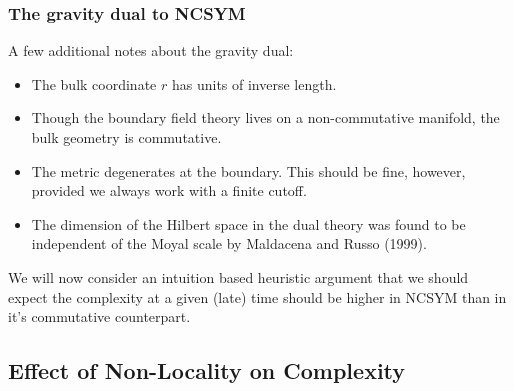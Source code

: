 \documentclass[8pt,aspectratio=169]{beamer}
\begin{document}
\begin{frame}
\frametitle{The gravity dual to NCSYM}

A few additional notes about the gravity dual:

\begin{itemize}

\item The bulk coordinate $r$ has units of inverse length.

\item Though the boundary field theory lives on a non-commutative manifold, the bulk geometry is commutative.

\item The metric degenerates at the boundary. This should be fine, however, provided we always work with a finite cutoff.

\item The dimension of the Hilbert space in the dual theory was found to be independent of the Moyal scale by Maldacena and Russo (1999).

\end{itemize}

We will now consider an intuition based heuristic argument that we should expect the complexity at a given (late) time should be higher in NCSYM than in it's commutative counterpart.

\end{frame}

\subsection{Effect of Non-Locality on Complexity}
\end{document}
